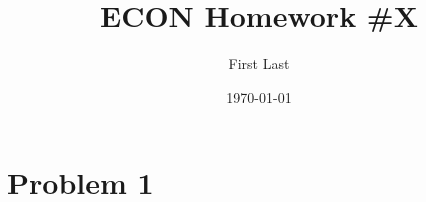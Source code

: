 \documentclass{scrartcl}
\title{ECON Homework \#X}
\author{First Last}
\date{\today}
\begin{document}
\maketitle

\section{Problem 1}
\end{document}
